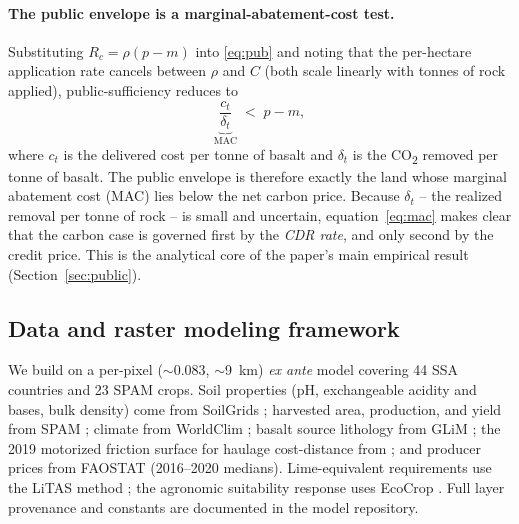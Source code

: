\documentclass[12pt]{article}
\newcommand{\co}{CO\textsubscript{2}}
\begin{document}
\paragraph{The public envelope is a marginal-abatement-cost test.}
Substituting $R_c=\rho(p-m)$ into \eqref{eq:pub} and noting that the per-hectare
application rate cancels between $\rho$ and $C$ (both scale linearly with tonnes
of rock applied), public-sufficiency reduces to
\begin{equation}
  \underbrace{\frac{c_t}{\delta_t}}_{\text{MAC}} \;<\; p - m,
  \label{eq:mac}
\end{equation}
where $c_t$ is the delivered cost per tonne of basalt and $\delta_t$ is the
\co{} removed per tonne of basalt. The public envelope is therefore exactly the
land whose marginal abatement cost (MAC) lies below the net carbon price. Because
$\delta_t$ -- the realized removal per tonne of rock -- is small and uncertain,
equation~\eqref{eq:mac} makes clear that the carbon case is governed first by the
\emph{CDR rate}, and only second by the credit price. This is the analytical
core of the paper's main empirical result (Section~\ref{sec:public}).

\subsection{Data and raster modeling framework}
We build on a per-pixel (\(\sim\)0.083\textdegree, \(\sim\)9~km) \emph{ex ante} model
covering 44 SSA countries and 23 SPAM crops. Soil properties (pH, exchangeable
acidity and bases, bulk density) come from SoilGrids \citep{poggio2021};
harvested area, production, and yield from SPAM \citep{yu2020}; climate from
WorldClim \citep{fick2017}; basalt source lithology from GLiM
\citep{hartmann2012}; the 2019 motorized friction surface for haulage
cost-distance from \citet{weiss2020}; and producer prices from FAOSTAT
\citep{faostat} (2016--2020 medians). Lime-equivalent requirements use the LiTAS
method \citep{aramburumerlos2023}; the agronomic suitability response uses
EcoCrop \citep{recocrop}. Full layer provenance and constants are documented in
the model repository.
\end{document}
